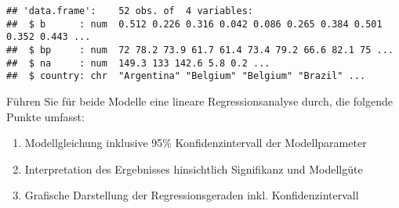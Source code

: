 \documentclass[
]{article}
\newenvironment{Shaded}{\begin{snugshade}}{\end{snugshade}}
\newcommand{\AttributeTok}[1]{\textcolor[rgb]{0.13,0.29,0.53}{#1}}
\newcommand{\CommentTok}[1]{\textcolor[rgb]{0.56,0.35,0.01}{\textit{#1}}}
\newcommand{\DecValTok}[1]{\textcolor[rgb]{0.00,0.00,0.81}{#1}}
\newcommand{\FunctionTok}[1]{\textcolor[rgb]{0.13,0.29,0.53}{\textbf{#1}}}
\newcommand{\NormalTok}[1]{#1}
\newcommand{\OtherTok}[1]{\textcolor[rgb]{0.56,0.35,0.01}{#1}}
\newcommand{\SpecialCharTok}[1]{\textcolor[rgb]{0.81,0.36,0.00}{\textbf{#1}}}
\providecommand{\tightlist}{%
  \setlength{\itemsep}{0pt}\setlength{\parskip}{0pt}}
\begin{document}
\begin{verbatim}
## 'data.frame':    52 obs. of  4 variables:
##  $ b      : num  0.512 0.226 0.316 0.042 0.086 0.265 0.384 0.501 0.352 0.443 ...
##  $ bp     : num  72 78.2 73.9 61.7 61.4 73.4 79.2 66.6 82.1 75 ...
##  $ na     : num  149.3 133 142.6 5.8 0.2 ...
##  $ country: chr  "Argentina" "Belgium" "Belgium" "Brazil" ...
\end{verbatim}

\begin{Shaded}
\end{Shaded}

Führen Sie für beide Modelle eine lineare Regressionsanalyse durch, die
folgende Punkte umfasst:

\begin{enumerate}
\def\labelenumi{\roman{enumi})}
\tightlist
\item
  Modellgleichung inklusive 95\% Konfidenzintervall der Modellparameter
\item
  Interpretation des Ergebnisses hinsichtlich Signifikanz und Modellgüte
\item
  Grafische Darstellung der Regressionsgeraden inkl. Konfidenzintervall
\end{enumerate}
\end{document}
